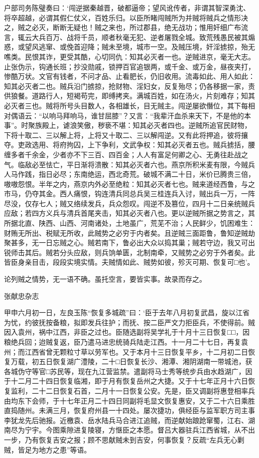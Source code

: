 \documentclass[]{article}
\begin{document}
户部司务陈璧奏曰：`闯逆据秦越晋，破都逼帝；望风讹传者，非谓其智深勇沈、将卒超越，必谓其假仁仗义，百姓乐归。以臣所睹闯贼所为并贼将贼兵之情形决之，贼之必灭，断断无疑也！贼之来也，所过郡县，绝无战功；惟用奸细广布流言，辄云大兵百万、战将千员，顺者秋毫无犯、逆者屠戮全城。致荒残愚民被其煽惑，或望风逃窜、或俛首迎降；贼未至境，城市一空。及贼压境，奸淫掳掠，殆无噍类。民恨其诈，更受其酷，心切同仇：知其必灭者一也。逆贼进京，毫无大志。止张伪示，钩通长班；抄没勋戚，锁押百官追银两，或千金、或万金，昼夜夹打，惨酷万状。文官有钱者，不问才品、止看肥长，仍旧收用。流毒如此、用人如此：知其必灭者二也。贼兵沿门掳掠，抢财物、淫妇女，反复殆尽；仍各移据一家，责供狼餐。道路行人，短褐苟完，即缚拷夹。满城百姓，如在汤火，片刻难存；知其必灭者三也。贼将所号头目数人，各相雄长，目无贼主。闯逆屡欲僭位，其下每相对偶语云：``以响马拜响马，谁甘屈膝''？又言：``我辈汗血杀来天下，不是他的本事''。时聚族殿上，谑浪笑傲，秽亵不堪：知其必灭者四也。逆贼所追官民财物，下将十取二、三以解上将，上将又十取二、三以解闯逆。又有此将押追，彼将攘夺。吏政选用、将府拘囚，上下争利，文武争权：知其必灭者五也。贼兵掳括，腰缠多者千余金，少者亦不下三百、四百金；人人有富足何卿之心、无勇往赴战之气。临敌必至怯亡，平日渐将溃散：知其必灭者六也。燕京所积米麦有限，今贼兵人马作践，指日必尽；东南绝运，西北奇荒。破城不满二十日，米价已腾贵三倍，嗷嗷怨恨。半年之内，燕京内外必至绝粒：知其必灭者七也。贼来道经西鲁，与之市马，仍夺其金。西人痛恨，钩连清兵同总兵吴三桂连兵入讨，贼出兵一万，一阵尽没，仅存七人；贼又络续发兵，兵众怨叹。闯逆不及篡位，四月十二日亲统贼兵应敌；若四方义兵与清兵首尾夹击，知其必灭者八也。更以逆贼所据之势言之，其所据北直、陕西、山西、河南诸处，土地虽广，荒芜不治；人民鲜少，饥困难生：财贿无所出、税赋无所收，此贼势之必穷于内者矣。且逆贼三面距鲁，鲁知逆贼劫聚甚多，无一日忘贼之心。贼若南下，鲁必出大众以捣其巢；贼若守边，我又可出锐师击其后。贼若分头应敌，则兵饷单匮，北制南牵，又贼势之必穷于外者矣。此皆臣身亲目击，段段实境实情。夫贼情如此、贼势如彼，殄灭可期、恢复可□也'。

论列贼之情势，无一语不确。虽托空言，要皆实事。故录而存之。

张献忠杂志

甲申六月初一日，左良玉陈``恢复多城疏''曰：`臣于去年八月初复武昌，旋以江省为忧，约彼抚按备粮，拟即发兵往护；而抚、按二臣严文力拒臣兵，不使得前。贼因入袁州，祸中江西，非臣之过也。臣随选副将吴学礼于十月十三日恢复□□，因粮绝兵回；迨贼复返，臣乃遣马进忠统骑兵陆走江西。十一月二十七日，再复袁州；而江西省曾无颗粒寸草以劳军也。又于本月十三日恢复平乡，十二月初二日恢复万载，初五日恢复湖广澧陵，二十□日恢复长沙、湘潭、湘阴湖南一带城池，获各城伪守等官□苏民等，现在九江营监禁。遣副将马士秀等统步兵由水趋湖广，因于十二月二十四日恢复临湘，即于月有恢复岳州之大捷。又于十七年正月十六日恢复监利，二十二日恢复石首，二月十一日恢复公安。先是，臣又调副将惠登相率兵由均东下会师，于十七年正月二十四日同副将毛显文恢复惠安，又于二十六日乘胜直捣随州。未满三月，恢复府州县一十四处。屡次捷功，俱经臣与监军职方司主事李犹龙先后驰报。近檄袁、岳水陆兵马合进江追贼，而逆献始踉跄窜蜀，江右、湖南尽为宁宇。今图乘隙进复陵寝，方惬臣之本愿。督吕大器驻兵江西省城，从不出一步，乃有恢复吉安之报；顾不思献贼未到吉安，何事恢复？反疏``左兵无心剿贼，皆足为地方之患''等语。
\end{document}
